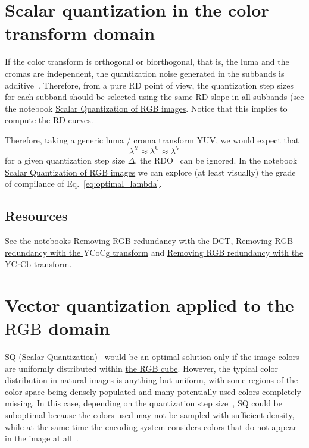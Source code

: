 \section{Scalar quantization in the color transform domain}

If the color transform is orthogonal or biorthogonal, that is, the luma
and the cromas are independent, the quantization noise generated in
the subbands is additive~\cite{burger2016digital}. Therefore, from a
pure RD point of view, the quantization step sizes for each subband
should be selected using the same RD slope in all subbands (see
the notebook
\href{https://github.com/vicente-gonzalez-ruiz/color_transforms/blob/main/docs/RGB/RGB_SQ.ipynb}{Scalar
  Quantization of RGB images}. Notice that this implies to compute the
RD curves.

Therefore, taking a generic luma / croma transform $\text{YUV}$, we would expect that
\begin{equation}
  \lambda^{\text{Y}} \approx \lambda^{\text{U}} \approx \lambda^{\text{V}}
  \label{eq:optimal_lambda}
\end{equation}
for a given quantization step size $\Delta$, the
RDO~\cite{vruiz__information_theory} can be ignored. In the notebook
\href{https://github.com/Sistemas-Multimedia/Sistemas-Multimedia.github.io/blob/master/contents/RGB_SQ/RGB_SQ.ipynb}{Scalar
  Quantization of RGB images} we can explore (at least visually) the
grade of compilance of Eq.~\eqref{eq:optimal_lambda}.

\subsection*{Resources}
See the notebooks
\href{https://github.com/vicente-gonzalez-ruiz/color_transforms/blob/main/docs/3DCT/3DCT_over_RGB.ipynb}{Removing
  RGB redundancy with the DCT},
\href{https://github.com/vicente-gonzalez-ruiz/color_transforms/blob/main/docs/YCoCg/YCoCg_over_RGB.ipynb}{Removing
  RGB redundancy with the $\text{YCoCg}$ transform} and
\href{https://github.com/vicente-gonzalez-ruiz/color_transforms/blob/main/docs/YCrCb/YCrCb_over_RGB.ipynb}{Removing
  RGB redundancy with the $\text{YCrCb}$ transform}.

\section{Vector quantization applied to the $\text{RGB}$ domain}

SQ (Scalar
Quantization)~\cite{vruiz__scalar_quantization,sayood2017introduction}
would be an optimal solution only if the image colors are uniformly
distributed within
\href{https://en.wikipedia.org/wiki/RGB_color_model}{the RGB
  cube}. However, the typical color distribution in natural images is
anything but uniform, with some regions of the color space being
densely populated and many potentially used colors completely
missing. In this case, depending on the quantization step
size~\cite{vruiz__signal_quantization}, SQ could be suboptimal because
the colors used may not be sampled with sufficient density, while at the
same time the encoding system considers colors that do not appear
in the image at all~\cite{burger2016digital}.


